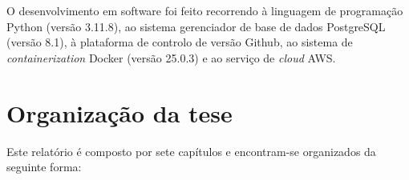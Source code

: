 O desenvolvimento em software foi feito recorrendo à linguagem de programação Python (versão 3.11.8), ao sistema gerenciador de base de dados PostgreSQL (versão 8.1), à plataforma de controlo de versão Github, ao sistema de \textit{containerization} Docker (versão 25.0.3) e ao serviço de \textit{cloud} AWS. 


























































\section{Organização da tese}

Este relatório é composto por sete capítulos e encontram-se organizados da seguinte forma: 

